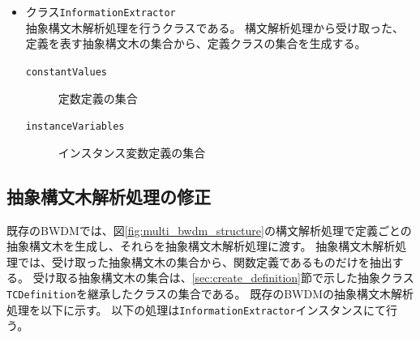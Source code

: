 \documentclass[uplatex, report, a4j, 10pt]{jsbook}
\newcommand\ttt[1]{\texttt{#1}}
\begin{document}
\begin{itemize}
  \item クラス\ttt{InformationExtractor}\\
        抽象構文木解析処理を行うクラスである。
        構文解析処理から受け取った、定義を表す抽象構文木の集合から、定義クラスの集合を生成する。
        \begin{description}
          \item[\ttt{\ttt{constantValues}}] 定数定義の集合
          \item[\ttt{\ttt{instanceVariables}}] インスタンス変数定義の集合
        \end{description}

\end{itemize}

\subsection{抽象構文木解析処理の修正}

既存のBWDMでは、図\ref{fig:multi_bwdm_structure}の構文解析処理で定義ごとの抽象構文木を生成し、それらを抽象構文木解析処理に渡す。
抽象構文木解析処理では、受け取った抽象構文木の集合から、関数定義であるものだけを抽出する。
受け取る抽象構文木の集合は、\ref{sec:create_definition}節で示した抽象クラス\ttt{TCDefinition}を継承したクラスの集合である。
既存のBWDMの抽象構文木解析処理を以下に示す。
以下の処理は\ttt{InformationExtractor}インスタンスにて行う。
\end{document}

